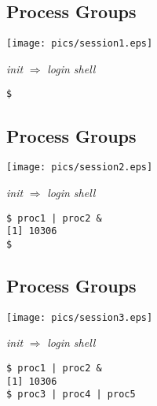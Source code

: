 \documentclass[xga]{xdvislides}
\begin{document}
\subsection{Process Groups}
\begin{center}
	\texttt{[image: pics/session1.eps]}
\end{center}

{\em init} $\Rightarrow$ {\em login shell}
\begin{verbatim}
$
\end{verbatim}

\subsection{Process Groups}
\begin{center}
	\texttt{[image: pics/session2.eps]}
\end{center}

{\em init} $\Rightarrow$ {\em login shell}
\begin{verbatim}
$ proc1 | proc2 &
[1] 10306
$
\end{verbatim}

\subsection{Process Groups}
\begin{center}
	\texttt{[image: pics/session3.eps]}
\end{center}

{\em init} $\Rightarrow$ {\em login shell}
\begin{verbatim}
$ proc1 | proc2 &
[1] 10306
$ proc3 | proc4 | proc5

\end{verbatim}
\end{document}
